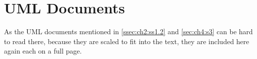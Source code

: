 \chapter{UML Documents}
\label{chap:appendix:design_docs}
As the \gls{UML} documents mentioned in \cref{ssec:ch2:ss1.2} and \cref{sec:ch4:s3} can be hard to read there, because they are scaled to fit into the text, they are included here again each on a full page.



